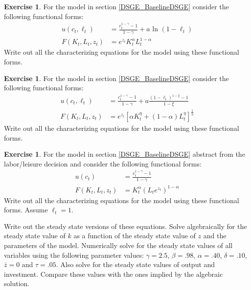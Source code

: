 \documentclass[letterpaper,12pt]{article}
\theoremstyle{definition}
\newtheorem{exercise}[theorem]{Exercise}
\begin{document}
\begin{spacing}{1.5}
	\begin{exercise} \label{DSGE_HW_CharEq_CES_Ln}
		For the model in section \ref{DSGE_BaselineDSGE} consider the following functional forms:
		\begin{equation}\label{DSGE_HW_CharEq_CES_Ln_eq01}
		\begin{split}
		u(c_t,\ell_t) & = \frac{c^{1-\gamma}_t -1}{1-\gamma}+ a \text{ ln }(1-\ell_t)\\
		F(K_t,L_t,z_t) & = e^{z_t}K^{\alpha}_t L^{1-\alpha}_t  \nonumber
		\end{split}
		\end{equation}
		Write out all the characterizing equations for the model using these functional forms.
	\end{exercise}

	\begin{exercise} \label{DSGE_HW_CharEq_CES}
		For the model in section \ref{DSGE_BaselineDSGE} consider the following functional forms:
		\begin{equation}\label{DSGE_HW_CharEq_CES_eq01}
		\begin{split}
		u(c_t,\ell_t) & = \frac{c^{1-\gamma}_t -1}{1-\gamma}+ a \frac{(1-\ell_t)^{1-\xi}-1}{1-\xi}      \\
		F(K_t,L_t,z_t) & = e^{z_t}\left[\alpha K^{\eta}_t +(1-\alpha)L^{\eta}_t \right]^{\frac{1}{\eta}}   \nonumber
		\end{split}
		\end{equation}
		Write out all the characterizing equations for the model using these functional forms.
	\end{exercise}

	\begin{exercise} \label{DSGE_HW_NoLeisure}
		For the model in section \ref{DSGE_BaselineDSGE} abstract from the labor/leisure decision and consider the following functional forms:
		\begin{equation}\label{DSGE_HW_NoLeisure_eq01}
		\begin{split}
		u(c_t) & = \frac{c^{1-\gamma}_t -1}{1-\gamma}      \\
		F(K_t,L_t,z_t) & = K^{\alpha}_t (L_te^{z_t})^{1-\alpha}  \nonumber
		\end{split}
		\end{equation}
		Write out all the characterizing equations for the model using these functional forms.  Assume $\ell_t=1$.

		Write out the steady state versions of these equations.  Solve algebraically for the steady state value of $k$ as a function of the steady state value of $z$ and the parameters of the model.  Numerically solve for the steady state values of all variables using the following parameter values: $\gamma = 2.5$, $\beta = .98$, $\alpha = .40$, $\delta = .10$, $\bar z = 0$ and $\tau = .05$.  Also solve for the steady state values of output and investment.  Compare these values with the ones implied by the algebraic solution.
	\end{exercise}


\end{spacing}
\end{document}

